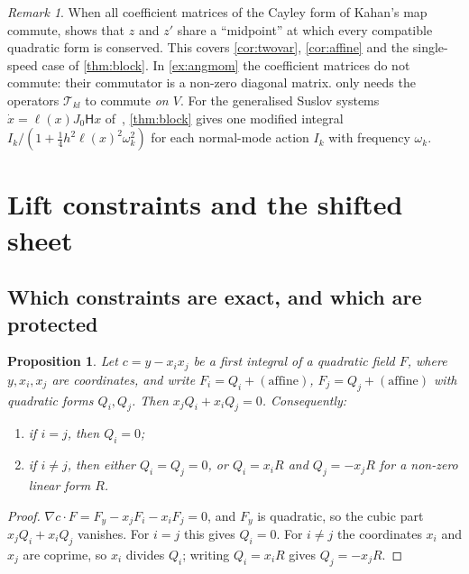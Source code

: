 \documentclass[11pt,a4paper]{article}
\newtheorem{proposition}[theorem]{Proposition}
\theoremstyle{definition}
\theoremstyle{remark}
\newtheorem{remark}[theorem]{Remark}
\newcommand{\T}{\mathcal{T}}
\begin{document}
\begin{remark}\label{rem:LP}
When all coefficient matrices of the Cayley form of Kahan's map commute, \cite{LP} shows that $z$ and $z'$
share a ``midpoint'' at which every compatible quadratic form is conserved. This covers
\cref{cor:twovar}, \cref{cor:affine} and the single-speed case of \cref{thm:block}. In
\cref{ex:angmom} the coefficient matrices do not commute: their commutator is a non-zero diagonal matrix.
 only needs the operators $\T_{kl}$ to commute \emph{on $V$}. For the generalised Suslov
systems $\dot x=\ell(x)J_0\mathsf Hx$ of~\cite{CMMOQ14}, \cref{thm:block} gives one modified integral
$I_k/(1+\frac14h^2\ell(x)^2\omega_k^2)$ for each normal-mode action $I_k$ with frequency $\omega_k$.
\end{remark}

\section{Lift constraints and the shifted sheet}\label{sec:lifts}

\subsection{Which constraints are exact, and which are protected}

\begin{proposition}\label{prop:classify}
Let $c=y-x_ix_j$ be a first integral of a quadratic field $F$, where $y,x_i,x_j$ are coordinates, and write
$F_i=Q_i+(\text{affine})$, $F_j=Q_j+(\text{affine})$ with quadratic forms $Q_i,Q_j$. Then
$x_jQ_i+x_iQ_j=0$. Consequently:
\begin{enumerate}[label=(\alph*)]
\item if $i=j$, then $Q_i=0$;
\item if $i\ne j$, then either $Q_i=Q_j=0$, or $Q_i=x_iR$ and $Q_j=-x_jR$ for a non-zero linear form $R$.
\end{enumerate}
\end{proposition}

\begin{proof}
$\nabla c\cdot F=F_y-x_jF_i-x_iF_j=0$, and $F_y$ is quadratic, so the cubic part $x_jQ_i+x_iQ_j$ vanishes.
For $i=j$ this gives $Q_i=0$. For $i\ne j$ the coordinates $x_i$ and $x_j$ are coprime, so $x_i$ divides
$Q_i$; writing $Q_i=x_iR$ gives $Q_j=-x_jR$.
\end{proof}
\end{document}
